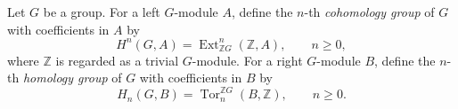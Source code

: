 Let $G$ be a group. For a left $G$-module $A$, define the $n$-th \emph{cohomology group} of $G$ with coefficients in $A$ by
$$H^n(G, A) = \operatorname{Ext}_{\mathbb{Z}G}^n(\mathbb{Z}, A), \qquad n \geq 0,$$
where $\mathbb{Z}$ is regarded as a trivial $G$-module. For a right $G$-module $B$, define the $n$-th \emph{homology group} of $G$ with coefficients in $B$ by
$$H_n(G, B) = \operatorname{Tor}_n^{\mathbb{Z}G}(B, \mathbb{Z}), \qquad n \geq 0.$$
